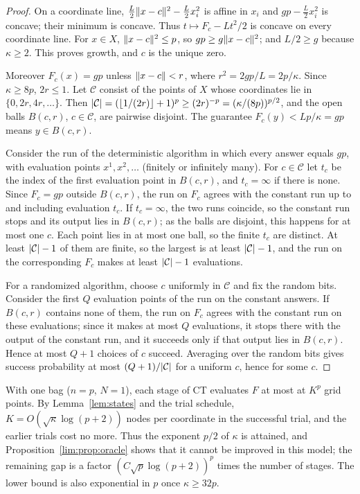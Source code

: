 \begin{proof}
On a coordinate line, $\frac L2\lVert x-c\rVert^2-\frac L2x_i^2$ is affine in
$x_i$ and $gp-\frac L2x_i^2$ is concave; their minimum is concave. Thus
$t\mapsto F_c-Lt^2/2$ is concave on every coordinate line. For $x\in X$,
$\lVert x-c\rVert^2\le p$, so $gp\ge g\lVert x-c\rVert^2$; and $L/2\ge g$ because
$\kappa\ge2$. This proves growth, and $c$ is the unique zero.

Moreover $F_c(x)=gp$ unless $\lVert x-c\rVert<r$, where $r^2=2gp/L=2p/\kappa$.
Since $\kappa\ge8p$, $2r\le1$. Let $\mathcal C$ consist of the points of
$X$ whose coordinates lie in $\{0,2r,4r,\ldots\}$. Then
$\lvert \mathcal C\rvert=(\lfloor1/(2r)\rfloor+1)^p\ge(2r)^{-p}=(\kappa/(8p))^{p/2}$,
and the open balls $B(c,r)$, $c\in\mathcal C$, are pairwise disjoint. The
guarantee $F_c(y)<Lp/\kappa=gp$ means $y\in B(c,r)$.

Consider the run of the deterministic algorithm in which every answer equals
$gp$, with evaluation points $x^1,x^2,\ldots$ (finitely or infinitely many).
For $c\in\mathcal C$ let $t_c$ be the index of the first evaluation point in
$B(c,r)$, and $t_c=\infty$ if there is none. Since $F_c=gp$ outside $B(c,r)$,
the run on $F_c$ agrees with the constant run up to and including evaluation
$t_c$. If $t_c=\infty$, the two runs coincide, so the constant run stops and
its output lies in $B(c,r)$; as the balls are disjoint, this happens for at
most one $c$. Each point lies in at most one ball, so the finite $t_c$ are
distinct. At least $\lvert \mathcal C\rvert-1$ of them are finite, so the largest
is at least $\lvert \mathcal C\rvert-1$, and the run on the corresponding $F_c$
makes at least $\lvert \mathcal C\rvert-1$ evaluations.

For a randomized algorithm, choose $c$ uniformly in $\mathcal C$ and fix the
random bits. Consider the first $Q$ evaluation points of the run on the
constant answers. If $B(c,r)$ contains none of them, the run on $F_c$ agrees
with the constant run on these evaluations; since it makes at most $Q$
evaluations, it stops there with the output of the constant run, and it
succeeds only if that output lies in $B(c,r)$. Hence at most $Q+1$ choices of
$c$ succeed. Averaging over the random bits gives success probability at most
$(Q+1)/\lvert \mathcal C\rvert$ for a uniform $c$, hence for some $c$.
\end{proof}

\begin{remark}\label{lim:rem:oracle}
With one bag ($n=p$, $N=1$), each stage of CT evaluates $F$ at most at
$K^p$ grid points. By Lemma~\ref{lem:states} and the trial schedule,
$K=O(\sqrt\kappa\log(p+2))$ nodes per coordinate in the successful trial,
and the earlier trials cost no more. Thus the exponent $p/2$ of $\kappa$ is
attained, and Proposition~\ref{lim:prop:oracle} shows that it cannot be
improved in this model; the remaining gap is a factor
$(C\sqrt p\log(p+2))^p$ times the number of stages. The lower bound is also
exponential in $p$ once $\kappa\ge32p$.
\end{remark}

